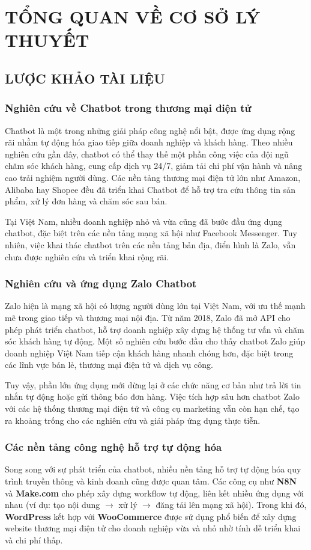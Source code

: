 \chapter{TỔNG QUAN VỀ CƠ SỞ LÝ THUYẾT}
\section{LƯỢC KHẢO TÀI LIỆU}  
\subsection{Nghiên cứu về Chatbot trong thương mại điện tử}
Chatbot là một trong những giải pháp công nghệ nổi bật, được ứng dụng rộng rãi nhằm tự động hóa giao tiếp giữa doanh nghiệp và khách hàng. Theo nhiều nghiên cứu gần đây, chatbot có thể thay thế một phần công việc của đội ngũ chăm sóc khách hàng, cung cấp dịch vụ 24/7, giảm tải chi phí vận hành và nâng cao trải nghiệm người dùng. Các nền tảng thương mại điện tử lớn như Amazon, Alibaba hay Shopee đều đã triển khai Chatbot để hỗ trợ tra cứu thông tin sản phẩm, xử lý đơn hàng và chăm sóc sau bán.  

Tại Việt Nam, nhiều doanh nghiệp nhỏ và vừa cũng đã bước đầu ứng dụng chatbot, đặc biệt trên các nền tảng mạng xã hội như Facebook Messenger. Tuy nhiên, việc khai thác chatbot trên các nền tảng bản địa, điển hình là Zalo, vẫn chưa được nghiên cứu và triển khai rộng rãi.  

\subsection{Nghiên cứu và ứng dụng Zalo Chatbot}
Zalo hiện là mạng xã hội có lượng người dùng lớn tại Việt Nam, với ưu thế mạnh mẽ trong giao tiếp và thương mại nội địa. Từ năm 2018, Zalo đã mở API cho phép phát triển chatbot, hỗ trợ doanh nghiệp xây dựng hệ thống tư vấn và chăm sóc khách hàng tự động. Một số nghiên cứu bước đầu cho thấy chatbot Zalo giúp doanh nghiệp Việt Nam tiếp cận khách hàng nhanh chóng hơn, đặc biệt trong các lĩnh vực bán lẻ, thương mại điện tử và dịch vụ công.  

Tuy vậy, phần lớn ứng dụng mới dừng lại ở các chức năng cơ bản như trả lời tin nhắn tự động hoặc gửi thông báo đơn hàng. Việc tích hợp sâu hơn chatbot Zalo với các hệ thống thương mại điện tử và công cụ marketing vẫn còn hạn chế, tạo ra khoảng trống cho các nghiên cứu và giải pháp ứng dụng thực tiễn.  

\subsection{Các nền tảng công nghệ hỗ trợ tự động hóa}
Song song với sự phát triển của chatbot, nhiều nền tảng hỗ trợ tự động hóa quy trình truyền thông và kinh doanh cũng được quan tâm. Các công cụ như \textbf{N8N} và \textbf{Make.com} cho phép xây dựng workflow tự động, liên kết nhiều ứng dụng với nhau (ví dụ: tạo nội dung $\rightarrow$ xử lý $\rightarrow$ đăng tải lên mạng xã hội). Trong khi đó, \textbf{WordPress} kết hợp với \textbf{WooCommerce} được sử dụng phổ biến để xây dựng website thương mại điện tử cho doanh nghiệp vừa và nhỏ nhờ tính dễ triển khai và chi phí thấp.  

